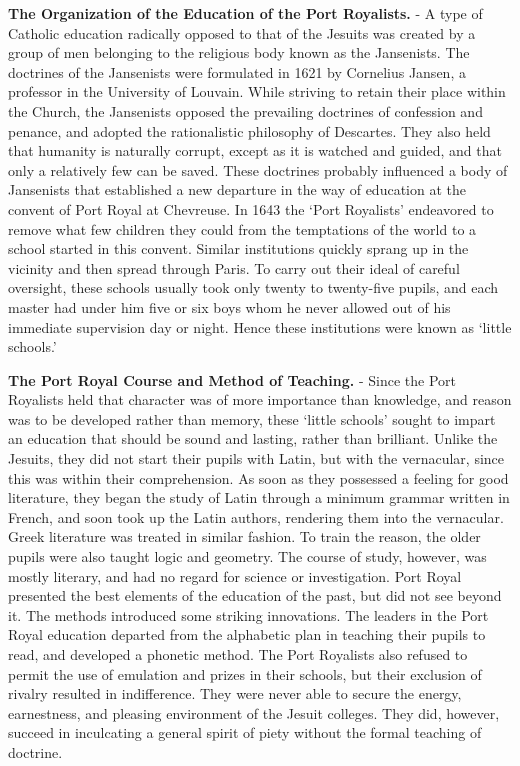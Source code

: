 \documentclass[]{book}
\begin{document}
\textbf{The Organization of the Education of the Port Royalists.} - A type of Catholic education radically opposed to that of the Jesuits was created by a group of men belonging to the religious body known as the Jansenists. The doctrines of the Jansenists were formulated in 1621 by Cornelius Jansen, a professor in the University of Louvain. While striving to retain their place within the Church, the Jansenists opposed the prevailing doctrines of confession and penance, and adopted the rationalistic philosophy of Descartes. They also held that humanity is naturally corrupt, except as it is watched and guided, and that only a relatively few can be saved. These doctrines probably influenced a body of Jansenists that established a new departure in the way of education at the convent of Port Royal at Chevreuse. In 1643 the `Port Royalists' endeavored to remove what few children they could from the temptations of the world to a school started in this convent. Similar institutions quickly sprang up in the vicinity and then spread through Paris. To carry out their ideal of careful oversight, these schools usually took only twenty to twenty-five pupils, and each master had under him five or six boys whom he never allowed out of his immediate supervision day or night. Hence these institutions were known as `little schools.'

\textbf{The Port Royal Course and Method of Teaching.} - Since the Port Royalists held that character was of more importance than knowledge, and reason was to be developed rather than memory, these `little schools' sought to impart an education that should be sound and lasting, rather than brilliant. Unlike the Jesuits, they did not start their pupils with Latin, but with the vernacular, since this was within their comprehension. As soon as they possessed a feeling for good literature, they began the study of Latin through a minimum grammar written in French, and soon took up the Latin authors, rendering them into the vernacular. Greek literature was treated in similar fashion. To train the reason, the older pupils were also taught logic and geometry. The course of study, however, was mostly literary, and had no regard for science or investigation. Port Royal presented the best elements of the education of the past, but did not see beyond it. The methods introduced some striking innovations. The leaders in the Port Royal education departed from the alphabetic plan in teaching their pupils to read, and developed a phonetic method. The Port Royalists also refused to permit the use of emulation and prizes in their schools, but their exclusion of rivalry resulted in indifference. They were never able to secure the energy, earnestness, and pleasing environment of the Jesuit colleges. They did, however, succeed in inculcating a general spirit of piety without the formal teaching of doctrine.
\end{document}
